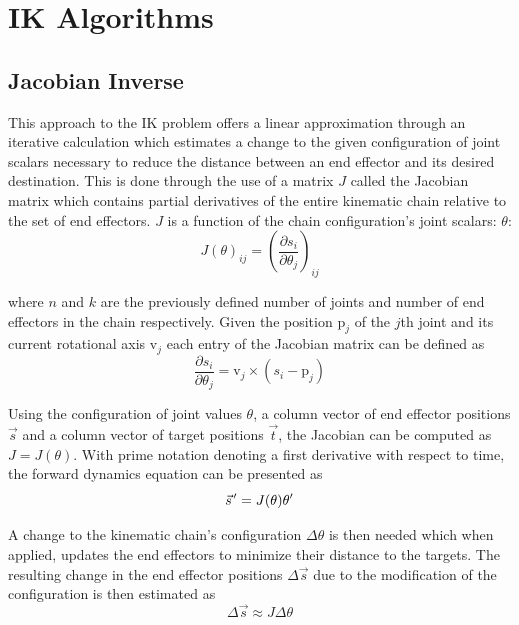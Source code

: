 \section{IK Algorithms}
\subsection{Jacobian Inverse}
This approach to the IK problem \cite{BALESTRINO19842435, wolovich, Baillieul} offers
a linear approximation through an iterative calculation which estimates a change
to the given configuration of joint scalars necessary to reduce the distance
between an end effector and its desired destination. This is done through the
use of a matrix \(J\) called the Jacobian matrix which contains partial derivatives of
the entire kinematic chain relative to the set of end effectors. \(J\) is
a function of the chain configuration's joint scalars:
\(\theta\):
\begin{equation}
    J(\theta)_{ij} = \left(\frac{\partial s_i}{\partial \theta_j}\right)_{ij}
\end{equation}

where \(n\) and \(k\) are the previously defined number of joints and number of
end effectors in the chain respectively. Given the position \(\mbox{p}_j\) of
the \(j\)th joint and its current rotational axis \(\mbox{v}_j\) each entry of
the Jacobian matrix can be defined as
\begin{equation}
    \frac{\partial s_i}{\partial \theta_j} = \mbox{v}_j \times (s_i - \mbox{p}_j)
\end{equation}

Using the configuration of joint values \(\theta\), a column vector of end
effector positions \(\vec{s}\) and a column vector of target positions
\(\vec{t}\), the Jacobian can be computed as \(J = J(\theta)\). With prime
notation denoting a first derivative with respect to time, the forward dynamics
equation can be presented as
\begin{equation}
    \pvec{s}^\prime = J(\theta)\theta^\prime
\end{equation}

A change to the kinematic chain's configuration \(\Delta \theta\) is then needed
which when applied, updates the end effectors to minimize their distance to the
targets. The resulting change in the end effector positions \(\Delta \vec{s}\)
due to the modification of the configuration is then estimated as
\begin{equation}
    \Delta \vec{s} \approx J \Delta \theta
\end{equation}

